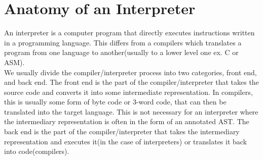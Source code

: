 \chapter{Anatomy of an Interpreter}
\label{sec:anatomy}
        
An \gls{interpreter} is a computer program that directly executes instructions written in a programming language.
This differs from a \glspl{compiler} which translates a program from one language to another(usually to a lower level one ex. C or ASM).\\
We usually divide the compiler/interpreter process into two categories, front end, and back end.
The front end is the part of the compiler/interpreter that takes the source code and converts it into some intermediate representation.
In compilers, this is usually some form of byte code or 3-word code, that can then be translated into the target language. 
This is not necessary for an interpreter where the intermediary representation is often in the form of an annotated AST.
The back end is the part of the compiler/interpreter that takes the intermediary representation and executes it(in the case of interpreters) or translates it back into code(compilers).\\

